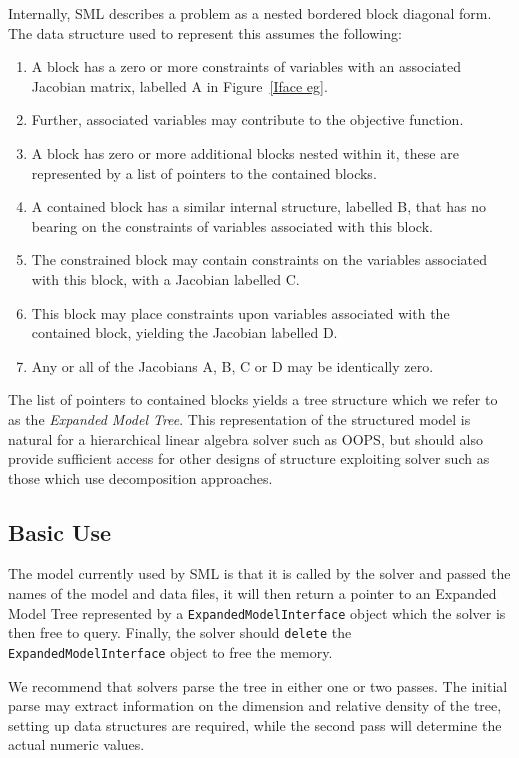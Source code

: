 \documentclass[10pt,a4paper]{book}
\begin{document}
Internally, SML describes a problem as a nested bordered block diagonal form.
The data structure used to represent this assumes the following:
\begin{enumerate}
   \item A block has a zero or more constraints of variables with an associated
      Jacobian matrix, labelled A in Figure~\ref{Iface eg}.
   \item Further, associated variables may contribute to the objective function.
   \item A block has zero or more additional blocks nested within it, these are
      represented by a list of pointers to the contained blocks.
   \item A contained block has a similar internal structure, labelled B, that
      has no bearing on the constraints of variables associated with this block.
   \item The constrained block may contain constraints on the variables
      associated with this block, with a Jacobian labelled C.
   \item This block may place constraints upon variables associated with
      the contained block, yielding the Jacobian labelled D.
   \item Any or all of the Jacobians A, B, C or D may be identically zero.
\end{enumerate}

The list of pointers to contained blocks yields a tree structure which
we refer to as the {\em Expanded Model Tree}. This representation of the structured
model is natural for a hierarchical linear algebra solver such as OOPS, but
should also provide sufficient access for other designs of structure exploiting
solver such as those which use decomposition approaches.

\subsection{Basic Use}

The model currently used by SML is that it is called by the solver and passed
the names of the model and data files, it will then return a pointer to an
Expanded Model Tree represented by a {\tt ExpandedModelInterface} object which
the solver is then free to query. Finally, the solver should {\tt delete} the
{\tt ExpandedModelInterface} object to free the memory.

We recommend that solvers parse the tree in either one or two passes. The
initial parse may extract information on the dimension and relative density of
the tree, setting up data structures are required, while the second pass will
determine the actual numeric values.
\end{document}
